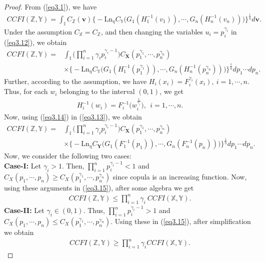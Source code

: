 \documentclass[12pt, a4paper]{article}
\numberwithin{equation}{section}
\begin{document}
\begin{proof}
 From (\ref{eq3.1}), we have
\begin{align}\label{eq3.12}
CCFI(\mathbb{Z},\mathbb{Y})=\int_{\mathbb I}C_\mathbb{Z}(\textbf{v})\Big\{-\mathrm{Ln}_\eta C_\mathbb{Y}\big(G_1(H_1^{-1}(v_1)),\cdots,G_n(H_n^{-1}(v_n))\big)\Big\}^{\frac{1}{\eta}}d\textbf{v}.
\end{align}
Under the assumption $C_{\mathbb{X}}=C_{\mathbb{Z}}$, and then changing the variables $u_i=p_i^{\gamma_i}$ in (\ref{eq3.12}), we obtain
\begin{align}\label{eq3.13}
CCFI(\mathbb{Z},\mathbb{Y})=&\int_{\mathbb I}\Big(\prod_{i=1}^{n}\gamma_ip_i^{\gamma_i-1}\Big) C_\textbf{X}(p_1^{\gamma_1},\cdots,p_n^{\gamma_n})\nonumber\\
&\times\Big\{-\mathrm{Ln}_\eta C_\mathbb{Y}\big(G_1(H_1^{-1}(p^{\gamma_1}_1)),\cdots,G_n(H_n^{-1}(p^{\gamma_n}_n))\big)\Big\}^{\frac{1}{\eta}}dp_1\cdots dp_n.
\end{align}
Further, according to the assumption, we have $H_i(x_i)=F_i^{\gamma_i}(x_i),~i=1,\cdots,n$. Thus, for each $w_i$ belonging to the interval $(0,1)$, we get 
\begin{align}\label{eq3.14}
H^{-1}_i(w_i)=F_i^{-1}\Big(w_i^{\frac{1}{\gamma_i}}\Big),~~ i=1,\cdots,n.
\end{align}
Now, using (\ref{eq3.14}) in (\ref{eq3.13}), we obtain
\begin{align}\label{eq3.15}
CCFI(\mathbb{Z},\mathbb{Y})=&\int_{\mathbb I}\Big(\prod_{i=1}^{n}\gamma_ip_i^{\gamma_i-1}\Big) C_\textbf{X}(p_1^{\gamma_1},\cdots,p_n^{\gamma_n})\nonumber\\
&\times\Big\{-\mathrm{Ln}_\eta C_\textbf{Y}\big(G_1(F_1^{-1}(p_1)),\cdots,G_n(F_n^{-1}(p_n))\big)\Big\}^{\frac{1}{\eta}}dp_1\cdots dp_n.
\end{align}
Now, we consider the following two cases:
\\

{\bf Case-I:} Let $\gamma_i>1$. Then, $\prod_{i=1}^{n}p_i^{\gamma_i-1}<1$ and $C_X(p_1,\cdots,p_n)\ge C_X(p^{\gamma_1}_1,\cdots,p^{\gamma_n}_n)$ since copula is an increasing function. Now, using these arguments in (\ref{eq3.15}), after some algebra we get
\begin{align*}
CCFI(\mathbb{Z},\mathbb{Y})\le \prod_{i=1}^n \gamma_i~ CCFI(\mathbb{X},\mathbb{Y}).
\end{align*}
{\bf Case-II:} Let $\gamma_i\in(0,1)$. Thus, $\prod_{i=1}^{n}p_i^{\gamma_i-1}>1$ and $C_X(p_1,\cdots,p_n)\le C_X(p^{\gamma_1}_1,\cdots,p^{\gamma_n}_n)$. Using these in (\ref{eq3.15}), after simplification we obtain
\begin{align*}
CCFI(\mathbb{Z},\mathbb{Y})\ge \prod_{i=1}^n \gamma_i CCFI(\mathbb{X},\mathbb{Y}).
\end{align*}
\end{proof}
\end{document}
